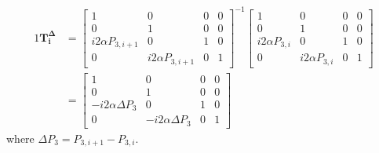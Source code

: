 \documentclass[notitlepage,nofootinbib]{revtex4-1}
\renewcommand{\vec}[1]{\mathbf{#1}}
\begin{document}
\begin{alignat}{1}
	\vec{T_i^\Delta}
	&=
	\begin{bmatrix}
		1 & 0 & 0 & 0 \\
		0 & 1 & 0 & 0 \\
		i2\alpha P_{3,i+1} & 0 & 1 & 0 \\
		0 & i2\alpha P_{3,i+1} & 0 & 1
	\end{bmatrix}^{-1}
	\begin{bmatrix}
		1 & 0 & 0 & 0 \\
		0 & 1 & 0 & 0 \\
		i2\alpha P_{3,i} & 0 & 1 & 0 \\
		0 & i2\alpha P_{3,i} & 0 & 1
	\end{bmatrix}
	\\
	&=
	\begin{bmatrix}
		1 & 0 & 0 & 0 \\
		0 & 1 & 0 & 0 \\
		-i2\alpha \Delta P_3 & 0 & 1 & 0 \\
		0 & -i2\alpha \Delta P_3 & 0 & 1
	\end{bmatrix}
\end{alignat}
where $ \Delta P_3 = P_{3,i+1} - P_{3,i} $.
\end{document}
